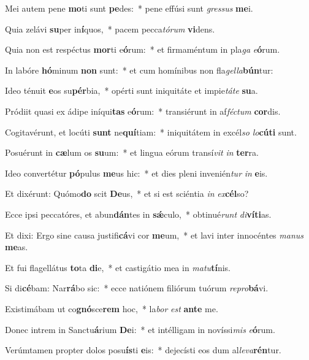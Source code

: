 \item Mei autem pene \textbf{mo}ti sunt \textbf{pe}des:~* pene effúsi sunt \textit{gres}\textit{sus} \textbf{me}i.
\item Quia zelávi \textbf{su}per in\textbf{í}quos,~* pacem pecca\textit{tó}\textit{rum} \textbf{vi}dens.
\item Quia non est respéctus \textbf{mor}ti e\textbf{ó}rum:~* et firmaméntum in pla\textit{ga} \textit{e}\textbf{ó}rum.
\item In labóre \textbf{hó}minum \textbf{non} sunt:~* et cum homínibus non fla\textit{gel}\textit{la}\textbf{bún}tur:
\item Ideo ténuit \textbf{e}os su\textbf{pér}bia,~* opérti sunt iniquitáte et impie\textit{tá}\textit{te} \textbf{su}a.
\item Pródiit quasi ex ádipe iníqui\textbf{tas} e\textbf{ó}rum:~* transiérunt in af\textit{féc}\textit{tum} \textbf{cor}dis.
\item Cogitavérunt, et locúti \textbf{sunt} ne\textbf{quí}tiam:~* iniquitátem in excél\textit{so} \textit{lo}\textbf{cú}\textbf{ti} sunt.
\item Posuérunt in \textbf{cæ}lum os \textbf{su}um:~* et lingua eórum transí\textit{vit} \textit{in} \textbf{ter}ra.
\item Ideo convertétur \textbf{pó}pulus \textbf{me}us hic:~* et dies pleni invenién\textit{tur} \textit{in} \textbf{e}is.
\item Et dixérunt: Quómo\textbf{do} scit \textbf{De}us,~* et si est sciéntia \textit{in} \textit{ex}\textbf{cél}so?
\item Ecce ipsi peccatóres, et abun\textbf{dán}tes in \textbf{sǽ}culo,~* obtinué\textit{runt} \textit{di}\textbf{ví}\textbf{ti}as.
\item Et dixi: Ergo sine causa justifi\textbf{cá}vi cor \textbf{me}um,~* et lavi inter innocéntes \textit{ma}\textit{nus} \textbf{me}as.
\item Et fui flagellátus \textbf{to}ta \textbf{di}e,~* et castigátio mea in \textit{ma}\textit{tu}\textbf{tí}nis.
\item Si di\textbf{cé}bam: Nar\textbf{rá}bo sic:~* ecce natiónem filiórum tuórum \textit{re}\textit{pro}\textbf{bá}vi.
\item Existimábam ut co\textbf{gnó}sce\textbf{rem} hoc,~* la\textit{bor} \textit{est} \textbf{an}\textbf{te} me.
\item Donec intrem in Sanctu\textbf{á}rium \textbf{De}i:~* et intélligam in novíssi\textit{mis} \textit{e}\textbf{ó}rum.
\item Verúmtamen propter dolos posu\textbf{ís}ti \textbf{e}is:~* dejecísti eos dum al\textit{le}\textit{va}\textbf{rén}tur.
